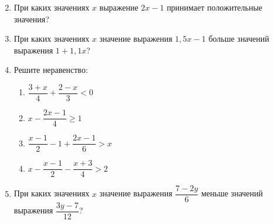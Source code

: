 \documentclass[12pt, a4paper]{article}
\begin{document}
\begin{enumerate}
\begin{multicols}{2}
\begin{enumerate}[label=\asbuk*)]
		\end{enumerate}
	\end{multicols}
	\item При каких значениях $x$ выражение $2x-1$ принимает положительные значения?
	\item При каких значениях $x$ значение выражения $1,5x-1$ больше значений выражения $1+1,1x$?
	\item Решите неравенство:
	\begin{multicols}{2}
		\begin{enumerate}[label=\asbuk*)]
			\item $\dfrac{3+x}{4}+\dfrac{2-x}{3}<0$
			\item $x-\dfrac{2x-1}{4}\ge1$
			\item $\dfrac{x-1}{2}-1+\dfrac{2x-1}{6}>x$
			\item $x-\dfrac{x-1}{2}-\dfrac{x+3}{4}>2$
		\end{enumerate}
	\end{multicols}
	\item При каких значениях $x$ значение выражения $\dfrac{7-2y}{6}$ меньше значений выражения $\dfrac{3y-7}{12}$?
\end{enumerate}
\end{document}
